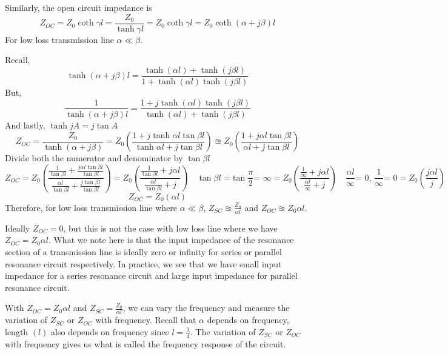 Similarly, the open circuit impedance is 
\begin{dmath*}
Z_{OC}=Z_0\coth\gamma l=\frac{Z_0}{\tanh\gamma l}
=Z_0\coth\gamma l=Z_0\coth(\alpha+j\beta) l
\end{dmath*}
For low loss transmission line $ \alpha\ll\beta $.

Recall, 
\[ \tanh(\alpha+j\beta)l=\frac{\tanh (\alpha l) + \tanh (j\beta l)}{1 + \tanh (\alpha l)\tanh (j\beta l)} \]
But,
\[ \frac{1}{\tanh(\alpha+j\beta)l}=\frac{1 + j\tanh (\alpha l)\tanh (j\beta l)}{\tanh (\alpha l) + \tanh (j\beta l)} \]
And lastly, $ \tanh jA= j \tan A $
\begin{dmath*}
Z_{OC} = \frac{Z_0}{\tanh(\alpha+j\beta)}
=Z_0\left(\frac{1+j\tanh \alpha l\tan \beta l}{\tanh \alpha l+j\tan \beta l}\right)
\approxeq Z_0\left(\frac{1+ j \alpha l\tan \beta l}{\alpha l+j\tan \beta l}\right)
\end{dmath*}
Divide both the numerator and denominator by $ \tan \beta l $
\begin{dmath*}
Z_{OC}=Z_0\left(\frac{\frac{1}{\tan \beta l}+\frac{j \alpha l\tan \beta l}{\tan \beta l}}{\frac{\alpha l}{\tan \beta l}+\frac{j\tan \beta l}{\tan \beta l}}\right)
=Z_0\left(\frac{\frac{1}{\tan \beta l} + j \alpha l}{\frac{\alpha l}{\tan \beta l} + j}\right)\quad\tan\beta l\text{ =}\tan\frac{\pi}{2}\text{= }\infty
=Z_0\left(\frac{\frac{1}{\infty} + j \alpha l}{\frac{\alpha l}{\infty} + j}\right)\quad\frac{\alpha l}{\infty}\text{= 0, }\frac{1}{\infty}\text{= 0}
=Z_0\left(\frac{j \alpha l}{j}\right)
\end{dmath*}
\begin{equation}
Z_{OC}=Z_0(\alpha l)
\end{equation}
Therefore, for low loss transmission line where $\alpha\ll\beta$, $ Z_{SC}\approxeq \frac{Z_0}{\alpha l} $ and $ Z_{OC} \approxeq Z_0 \alpha l $. 

Ideally $ Z_{OC}=0 $, but this is not the case with low loss line where we have $ Z_{OC} = Z_0 \alpha l $. What we note here is that the input impedance of the resonance section of a transmission line is ideally zero or infinity for series or parallel resonance circuit respectively. In practice, we see that we have small input impedance for a series resonance circuit and large input impedance for parallel resonance circuit.

With $ Z_{OC} = Z_0 \alpha l $ and 
$ Z_{SC}= \frac{Z_0}{\alpha l} $, we can vary the frequency and measure the variation of $ Z_{SC} $ or $ Z_{OC} $ with frequency. Recall that $ \alpha $ depends on frequency, length $(l)$ also depends on frequency since $ l=\frac{\lambda}{4} $. The variation of $ Z_{SC} $ or $ Z_{OC} $ with frequency gives us what is called the frequency response of the circuit.

